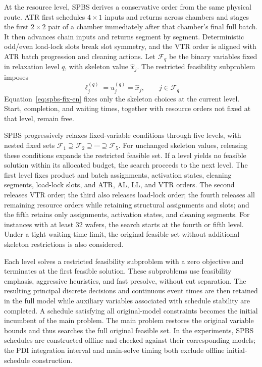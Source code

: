 \documentclass[journal]{IEEEtran}
\begin{document}
At the resource level, SPBS derives a conservative order from the same physical route. ATR first schedules $4\times1$ inputs and returns across chambers and stages the first $2\times2$ pair of a chamber immediately after that chamber's final full batch. It then advances chain inputs and returns segment by segment. Deterministic odd/even load-lock slots break slot symmetry, and the VTR order is aligned with ATR batch progression and cleaning actions. Let $\mathcal F_q$ be the binary variables fixed in relaxation level $q$, with skeleton value $\widehat x_j$. The restricted feasibility subproblem imposes
\begin{equation}
\ell_j^{(q)}=u_j^{(q)}=\widehat x_j,\qquad j\in\mathcal F_q
\label{eq:spbs-fix-en}
\end{equation}
Equation~\eqref{eq:spbs-fix-en} fixes only the skeleton choices at the current level. Start, completion, and waiting times, together with resource orders not fixed at that level, remain free.

SPBS progressively relaxes fixed-variable conditions through five levels, with nested fixed sets $\mathcal F_1\supseteq\mathcal F_2\supseteq\cdots\supseteq\mathcal F_5$. For unchanged skeleton values, releasing these conditions expands the restricted feasible set. If a level yields no feasible solution within its allocated budget, the search proceeds to the next level. The first level fixes product and batch assignments, activation states, cleaning segments, load-lock slots, and ATR, AL, LL, and VTR orders. The second releases VTR order; the third also releases load-lock order; the fourth releases all remaining resource orders while retaining structural assignments and slots; and the fifth retains only assignments, activation states, and cleaning segments. For instances with at least 32 wafers, the search starts at the fourth or fifth level. Under a tight waiting-time limit, the original feasible set without additional skeleton restrictions is also considered.

Each level solves a restricted feasibility subproblem with a zero objective and terminates at the first feasible solution. These subproblems use feasibility emphasis, aggressive heuristics, and fast presolve, without cut separation. The resulting principal discrete decisions and continuous event times are then retained in the full model while auxiliary variables associated with schedule stability are completed. A schedule satisfying all original-model constraints becomes the initial incumbent of the main problem. The main problem restores the original variable bounds and thus searches the full original feasible set. In the experiments, SPBS schedules are constructed offline and checked against their corresponding models; the PDI integration interval and main-solve timing both exclude offline initial-schedule construction.
\end{document}
